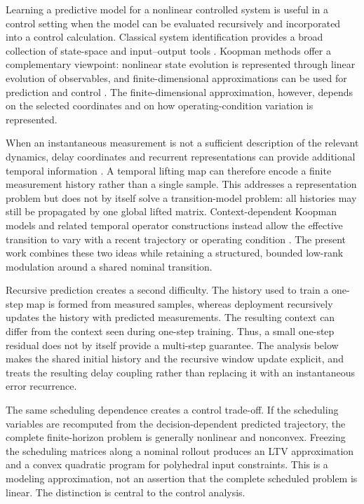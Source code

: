 ﻿\documentclass[journal]{IEEEtran}
\begin{document}
Learning a predictive model for a nonlinear controlled system is useful in a control setting when the model can be evaluated recursively and incorporated into a control calculation. Classical system identification provides a broad collection of state-space and input--output tools \cite{ljung1999system,vanoverschee1994n4sid,nelles2020nonlinear}. Koopman methods offer a complementary viewpoint: nonlinear state evolution is represented through linear evolution of observables, and finite-dimensional approximations can be used for prediction and control \cite{koopman1931hamiltonian,mezic2005spectral,williams2015data,korda2018linear,brunton2022modern}. The finite-dimensional approximation, however, depends on the selected coordinates and on how operating-condition variation is represented.

When an instantaneous measurement is not a sufficient description of the relevant dynamics, delay coordinates and recurrent representations can provide additional temporal information \cite{brunton2017chaos,kamb2020timedelay,arbabi2017ergodic,das2019delay,shenoy2025temporal,han2024robust}. A temporal lifting map can therefore encode a finite measurement history rather than a single sample. This addresses a representation problem but does not by itself solve a transition-model problem: all histories may still be propagated by one global lifted matrix. Context-dependent Koopman models and related temporal operator constructions instead allow the effective transition to vary with a recent trajectory or operating condition \cite{liu2023koopa,li2025mamko,forootani2025deepkoopformer}. The present work combines these two ideas while retaining a structured, bounded low-rank modulation around a shared nominal transition.

Recursive prediction creates a second difficulty. The history used to train a one-step map is formed from measured samples, whereas deployment recursively updates the history with predicted measurements. The resulting context can differ from the context seen during one-step training. Thus, a small one-step residual does not by itself provide a multi-step guarantee. The analysis below makes the shared initial history and the recursive window update explicit, and treats the resulting delay coupling rather than replacing it with an instantaneous error recurrence.

The same scheduling dependence creates a control trade-off. If the scheduling variables are recomputed from the decision-dependent predicted trajectory, the complete finite-horizon problem is generally nonlinear and nonconvex. Freezing the scheduling matrices along a nominal rollout produces an LTV approximation and a convex quadratic program for polyhedral input constraints. This is a modeling approximation, not an assertion that the complete scheduled problem is linear. The distinction is central to the control analysis.
\end{document}
